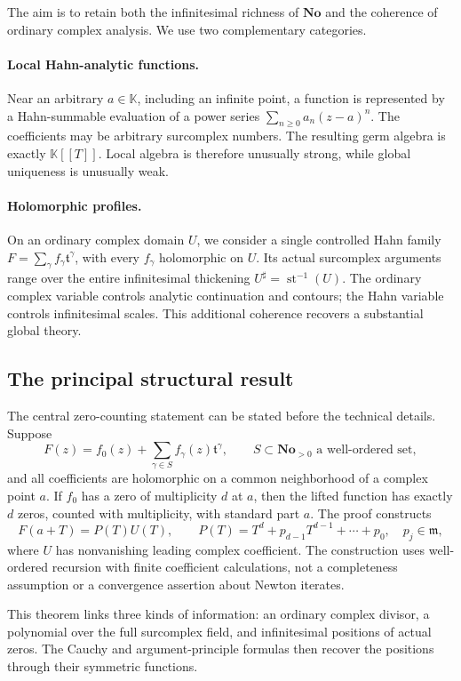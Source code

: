 \documentclass[11pt,a4paper]{article}
\numberwithin{equation}{section}
\theoremstyle{definition}
\newcommand{\No}{\mathbf{No}}
\newcommand{\K}{\mathbb K}
\newcommand{\tmon}{\mathfrak t}
\newcommand{\mm}{\mathfrak m}
\newcommand{\st}{\operatorname{st}}
\begin{document}
The aim is to retain both the infinitesimal richness of $\No$ and the
coherence of ordinary complex analysis. We use two complementary categories.

\paragraph{Local Hahn-analytic functions.}
Near an arbitrary $a\in\K$, including an infinite point, a function is represented
by a Hahn-summable evaluation of a power series
$\sum_{n\geq0}a_n(z-a)^n$. The coefficients may be arbitrary surcomplex numbers.
The resulting germ algebra is exactly $\K[[T]]$. Local algebra is therefore
unusually strong, while global uniqueness is unusually weak.

\paragraph{Holomorphic profiles.}
On an ordinary complex domain $U$, we consider a single controlled Hahn family
$F=\sum_\gamma f_\gamma\tmon^\gamma$, with every $f_\gamma$ holomorphic on $U$.
Its actual surcomplex arguments range over the entire infinitesimal thickening
$U^\sharp=\st^{-1}(U)$. The ordinary complex variable controls analytic
continuation and contours; the Hahn variable controls infinitesimal scales.
This additional coherence recovers a substantial global theory.

\subsection{The principal structural result}

The central zero-counting statement can be stated before the technical details.
Suppose
\[
 F(z)=f_0(z)+\sum_{\gamma\in S} f_\gamma(z)\tmon^\gamma,
 \qquad S\subset\No_{>0}\text{ a well-ordered set},
\]
and all coefficients are holomorphic on a common neighborhood of a complex
point $a$. If $f_0$ has a zero of multiplicity $d$ at $a$, then the lifted function
has exactly $d$ zeros, counted with multiplicity, with standard part $a$.
The proof constructs
\[
 F(a+T)=P(T)U(T),\qquad
 P(T)=T^d+p_{d-1}T^{d-1}+\cdots+p_0,\quad p_j\in\mm,
\]
where $U$ has nonvanishing leading complex coefficient. The construction uses
well-ordered recursion with finite coefficient calculations, not a completeness
assumption or a convergence assertion about Newton iterates.

This theorem links three kinds of information: an ordinary complex divisor,
a polynomial over the full surcomplex field, and infinitesimal positions of
actual zeros. The Cauchy and argument-principle formulas then recover the
positions through their symmetric functions.
\end{document}
